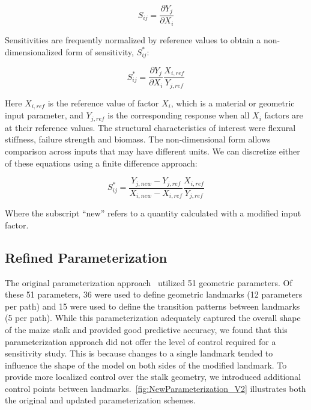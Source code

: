 \begin{equation}
	\label{eq:bare_sensitivity}
	S_{ij} = \frac{\partial Y_{j}}{\partial X_{i}}
\end{equation}

Sensitivities are frequently normalized by reference values to obtain a non-dimensionalized form of sensitivity, ${S_{ij}^{*}}$:

\begin{equation}
	\label{eq:normalized_sensitivity}
	S_{ij}^{*} = \frac{\partial Y_{j}}{\partial X_{i}} \frac{X_{i, ref}}{Y_{j, ref}}
\end{equation}

Here ${X_{i, ref}}$ is the reference value of factor ${X_{i}}$, which is a material or geometric input parameter, and ${Y_{j, ref}}$ is the corresponding response when all ${X_{i}}$ factors are at their reference values. The structural characteristics of interest were flexural stiffness, failure strength and biomass. The non-dimensional form allows comparison across inputs that may have different units. We can discretize either of these equations using a finite difference approach:

\begin{equation}
	\label{eq:normalized_sensitivity2}
	S_{ij}^{*} = \frac{Y_{j, new} - Y_{j, ref}}{X_{i, new} - X_{i, ref}} \frac{X_{i, ref}}{Y_{j, ref}}
\end{equation}

Where the subscript “new” refers to a quantity calculated with a modified input factor.

\subsection{Refined Parameterization}
\label{ssec:refined_parameterization}
The original parameterization approach~ utilized 51 geometric parameters. Of these 51 parameters, 36 were used to define geometric landmarks (12 parameters per path) and 15 were used to define the transition patterns between landmarks (5 per path). While this parameterization adequately captured the overall shape of the maize stalk and provided good predictive accuracy, we found that this parameterization approach did not offer the level of control required for a sensitivity study. This is because changes to a single landmark tended to influence the shape of the model on both sides of the modified landmark. To provide more localized control over the stalk geometry, we introduced additional control points between landmarks.~\cref{fig:NewParameterization_V2} illustrates both the original and updated parameterization schemes.

